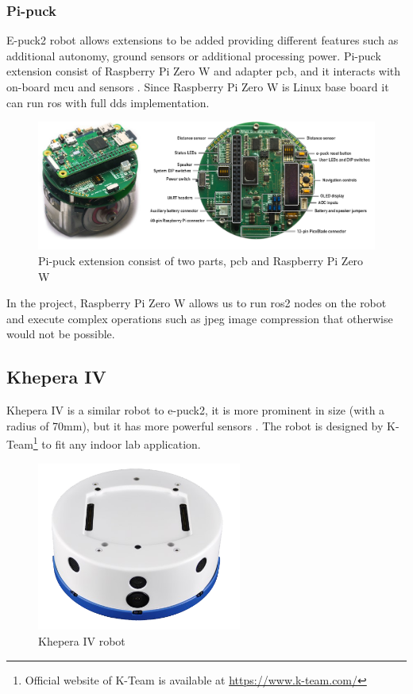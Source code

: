 \subsubsection{Pi-puck}

E-puck2 robot allows extensions to be added providing different features such as additional autonomy, ground sensors or additional processing power.
Pi-puck extension consist of Raspberry Pi Zero W and adapter \ac{pcb}, and it interacts with on-board \ac{mcu} and sensors \cite{millard_pi-puck_2017}.
Since Raspberry Pi Zero W is Linux base board it can run \ac{ros} with full \ac{dds} implementation.

\begin{figure}[H]
    \centering
    \includegraphics[width=\textwidth]{background/figures/pi-puck.png}
    \caption{Pi-puck extension consist of two parts, \ac{pcb} and Raspberry Pi Zero W \cite{millard_pi-puck_2017}}
    \label{fig:background:pi-puck}
\end{figure}

In the project, Raspberry Pi Zero W allows us to run \ac{ros2} nodes on the robot and execute complex operations such as \acs{jpeg} image compression that otherwise would not be possible.

\subsection{Khepera IV}

Khepera IV is a similar robot to e-puck2, it is more prominent in size (with a radius of 70mm), but it has more powerful sensors \cite{reis_khepera_2016}.
The robot is designed by K-Team\footnote{Official website of K-Team is available at \url{https://www.k-team.com/}} to fit any indoor lab application.

\begin{figure}[H]
    \centering
    \includegraphics[width=0.6\textwidth]{background/figures/khepera_iv.png}
    \caption{Khepera IV robot \cite{reis_khepera_2016}}
    \label{fig:background:khepera_iv}
\end{figure}


